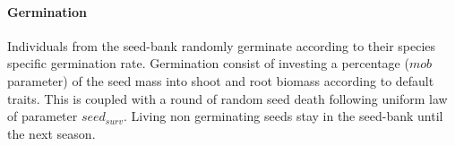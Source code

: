 \documentclass[a4paper,twoside, justified,marginals=raggedright, nobib]{tufte-handout}
\begin{document}
\paragraph{Germination} Individuals from the seed-bank randomly germinate according to their species specific germination rate. Germination consist of investing a percentage ($mob$ parameter) of the seed mass into shoot and root biomass according to default traits. This is coupled with a round of random seed death following uniform law of parameter $seed_{surv}$. Living non germinating seeds stay in the seed-bank until the next season.\\
%
%
% 
%
%
\end{document}
